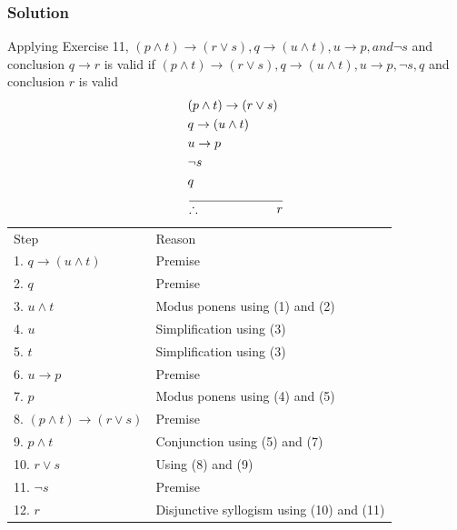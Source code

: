 \documentclass{article}
\begin{document}
\subsubsection*{Solution}
Applying Exercise 11, $(p \land t) \to(r \lor s), q \to (u \land t), u \to p, and \lnot s$ and conclusion $q \to r$ is valid if $(p \land t) \to(r \lor s), q \to (u \land t), u \to p,\lnot s, q$ and conclusion $r$ is valid
\begin{align*}
     & (p \land t) \to(r \lor s)                              \\
     & q \to (u \land t)                                      \\
     & u \to p                                                \\
     & \lnot s                                                \\
     & q                                                      \\
     & \over\therefore \quad \quad \quad \quad \quad \quad  r
\end{align*}
\begin{tabular}{l l}
    \centering
    Step                           & Reason                                    \\
    1. $q \to (u \land t)$         & Premise                                   \\
    2. $q$                         & Premise                                   \\
    3. $u \land t$                 & Modus ponens using (1) and (2)            \\
    4. $u$                         & Simplification using (3)                  \\
    5. $t$                         & Simplification using (3)                  \\
    6. $u \to p$                   & Premise                                   \\
    7. $p$                         & Modus ponens using (4) and (5)            \\
    8. $(p \land t) \to(r \lor s)$ & Premise                                   \\
    9. $p \land t$                 & Conjunction using (5) and (7)             \\
    10. $r \lor s$                 & Using (8) and (9)                         \\
    11. $\lnot s$                  & Premise                                   \\
    12. $r$                        & Disjunctive syllogism using (10) and (11) \\
\end{tabular}\\
\end{document}
